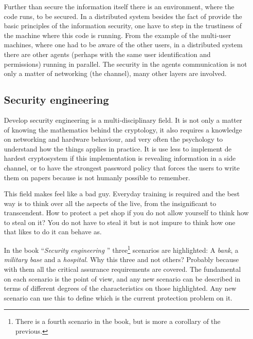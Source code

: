 \documentclass[10pt,a4paper,twoside]{llncs}
\begin{document}
Further than secure the information itself there is an environment, where the code runs, to be secured. In a distributed system besides the fact of provide the basic principles of the information security, one have to step in the trustiness of the machine where this code is running. From the example of the multi-user machines, where one had to be aware of the other users, in a distributed system there are other agents (perhaps with the same user identification and permissions) running in parallel. The security in the agents communication is not only a matter of networking (the channel), many other layers are involved.

\subsection{Security engineering}\label{sec:SecurityEngineering}

Develop security engineering is a multi-disciplinary field. It is not only a matter of knowing the mathematics behind the cryptology, it also requires a knowledge on networking and hardware behaviour, and very often the psychology to understand how the things applies in practice. It is use less to implement de hardest cryptosystem if this implementation is revealing information in a side channel, or to have the strongest password policy that forces the users to write them on papers because is not humanly possible to remember.

This field makes feel like a bad guy. Everyday training is required and the best way is to think over all the aspects of the live, from the insignificant to transcendent. How to protect a pet shop if you do not allow yourself to think how to steal on it? You do not have to steal it but is not impure to think how one that likes to do it can behave as.

In the book ``\emph{Security engineering \cite{SecEngRossAnderson}}'' three\footnote{There is a fourth scenario in the book, but is more a corollary of the previous.} scenarios are highlighted: A \emph{bank}, a \emph{military base} and a \emph{hospital}. Why this three and not others? Probably because with them all the critical assurance requirements are covered. The fundamental on each scenario is the point of view, and any new scenario can be described in terms of different degrees of the characteristics on those highlighted. Any new scenario can use this to define which is the current protection problem on it.
\end{document}

